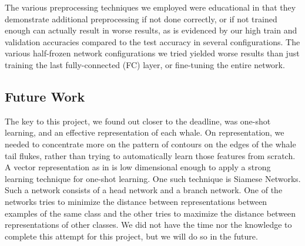 The various preprocessing techniques we employed were educational in that they demonstrate additional preprocessing if not done correctly, or if not trained enough can actually result in worse results, as is evidenced by our high train and validation accuracies compared to the test accuracy in several configurations. The various half-frozen network configurations we tried yielded worse results than just training the last fully-connected (FC) layer, or fine-tuning the entire network.

\subsection{Future Work}

The key to this project, we found out closer to the deadline, was one-shot learning, and an effective representation of each whale. On representation, we needed to concentrate more on the pattern of contours on the edges of the whale tail flukes, rather than trying to automatically learn those features from scratch. A vector representation as in \cite{weideman2017integral} is low dimensional enough to apply a strong learning technique for one-shot learning. One such technique is Siamese Networks. Such a network consists of a head network and a branch network. One of the networks tries to minimize the distance between representations between examples of the same class and the other tries to maximize the distance between representations of other classes. We did not have the time nor the knowledge to complete this attempt for this project, but we will do so in the future.